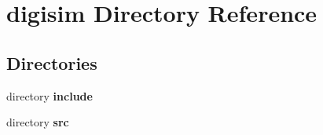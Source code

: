\section{digisim Directory Reference}
\label{dir_a10cf37201e086df62f395429e6564e1}
\subsection*{Directories}
\begin{DoxyCompactItemize}
\item 
directory {\bf include}
\item 
directory {\bf src}
\end{DoxyCompactItemize}
